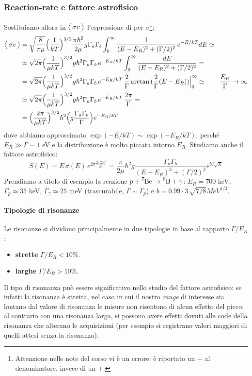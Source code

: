 \subsubsection{Reaction-rate e fattore astrofisico}
Sostituiamo allora in $\bigl\langle\, \sigma v\, \bigr\rangle$ l'espressione di \BW{} per $\sigma$\footnote{Attenzione nelle note del corso vi è un errore: è riportato un $-$ al denominatore, invece di un $+$.}:
\begin{displaymath}
\begin{aligned}
\bigl\langle\, \sigma v\, \bigr\rangle &= \sqrt{\frac{8}{\pi\mu}} \Bigl ( \frac{1}{kT} \Bigr )^{3/2} \frac{\pi\hbar^2}{2\mu} g \Gamma_a\Gamma_b \int_0^\infty \frac{1}{(E-E_R)^2 + (\Gamma/2)^2} \, e^{-E/kT} dE \simeq \\
&\simeq \sqrt{2\pi}\Bigl ( \frac{1}{\mu kT} \Bigr )^{3/2} g\hbar^2 \Gamma_a\Gamma_b\, e^{-E_R/kT} \int_0^\infty \frac{dE}{(E-E_R)^2 + (\Gamma/2)^2} =\\
&= \sqrt{2\pi}\Bigl ( \frac{1}{\mu kT} \Bigr )^{3/2} g\hbar^2 \Gamma_a\Gamma_b\, e^{-E_R/kT} \,\frac{2}{\Gamma} \arctan{(\frac{2}{\Gamma}(E-E_R))}\Bigr |_{0}^\infty \simeq \qquad \frac{E_R}{\Gamma}\to \infty \\
&\simeq \sqrt{2\pi}\Bigl ( \frac{1}{\mu kT} \Bigr )^{3/2} g\hbar^2 \Gamma_a\Gamma_b\, e^{-E_R/kT} \, \frac{2\pi}{\Gamma} = \\
&= \Bigl ( \frac{2\pi}{\mu kT} \Bigr )^{3/2} \hbar^2 \Bigl ( g\frac{\Gamma_a\Gamma_b}{\Gamma} \Bigr )e^{-E_R/kT}
\end{aligned}
\end{displaymath}
dove abbiamo approssimato $\exp{(-E/kT)}\sim \exp{(-E_R/kT)}$, perché $E_R\gg \Gamma \sim 1$ eV e la distribuzione è molto piccata intorno $E_R$. Studiamo anche il fattore astrofisico:
$$S(E)=E\, \sigma(E) \, e^{2\pi\frac{Z_1Z_2e^2}{\hbar v}}= \frac{\pi}{2\mu} \hbar^2 g \frac{\Gamma_a\Gamma_b}{(E-E_R)^2+(\Gamma/2)^2}e^{b/\sqrt{E}}$$
Prendiamo a titolo di esempio la reazione $p+\ce{^7Be}\to \ce{^8B} +\gamma$: $E_R=700$ keV, $\Gamma_p \simeq 35$ keV, $\Gamma_\gamma \simeq 25$ meV (trascurabile, $\Gamma \sim \Gamma_p$) e $b=0.99\cdot 3\,\sqrt{7/8}\unit{MeV}^{1/2}$. 

\paragraph{Tipologie di risonanze} Le risonanze si dividono principalmente in due tipologie in base al rapporto $\Gamma/E_R$:
\begin{itemize}
    \item \textbf{strette} $\Gamma/E_R<10\%$.
    \item \textbf{larghe} $\Gamma/E_R>10\%$.
\end{itemize}
Il tipo di risonanza può essere significativo nello studio del fattore astrofisico: se infatti la risonanza è stretta, nel caso in cui il nostro \textit{range} di interesse sia lontano dal valore di risonanza le misure non risentono di alcun effetto del picco; al contrario con una risonanza larga, si possono avere effetti dovuti alle code della risonanza che alterano le acquisizioni (per esempio si registrano valori maggiori di quelli attesi senza la risonanza).

